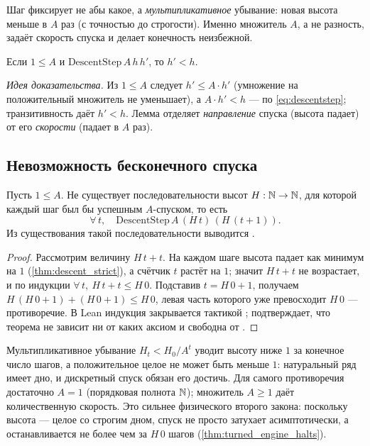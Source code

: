 Шаг фиксирует не абы какое, а \emph{мультипликативное} убывание: новая высота меньше в $A$ раз (с
точностью до строгости). Именно множитель $A$, а не разность, задаёт скорость спуска и делает
конечность неизбежной.

\begin{lemma}\label{thm:descent_strict}
\green{}\; Если $1\le A$ и $\mathrm{DescentStep}\,A\,h\,h'$, то $h'<h$.
\end{lemma}

\emph{Идея доказательства.} Из $1\le A$ следует $h'\le A\cdot h'$ (умножение на положительный
множитель не уменьшает), а $A\cdot h'<h$ --- по \cref{eq:descentstep}; транзитивность даёт $h'<h$.
Лемма отделяет \emph{направление} спуска (высота падает) от его \emph{скорости} (падает в $A$ раз).

\subsection{Невозможность бесконечного спуска}

\begin{theorem}\label{thm:no_infinite_descent}
\green{}\; Пусть $1\le A$. Не существует последовательности высот $H:\mathbb{N}\to\mathbb{N}$, для которой каждый шаг
был бы успешным $A$-спуском, то есть
\begin{equation}\label{eq:perpetualheights}
  \forall\, t,\quad \mathrm{DescentStep}\,A\,(H\,t)\,(H\,(t+1)).
\end{equation}
Из существования такой последовательности выводится .
\end{theorem}

\begin{proof}
Рассмотрим величину $H\,t+t$. На каждом шаге высота падает как минимум на $1$ (\cref{thm:descent_strict}),
а счётчик $t$ растёт на $1$; значит $H\,t+t$ не возрастает, и по индукции $\forall\,t,\ H\,t+t\le H\,0$.
Подставив $t=H\,0+1$, получаем $H\,(H\,0+1)+(H\,0+1)\le H\,0$, левая часть которого уже превосходит
$H\,0$ --- противоречие. В Lean индукция закрывается тактикой ; 
подтверждает, что теорема не зависит ни от каких аксиом и свободна от .
\end{proof}

Мультипликативное убывание $H_t<H_0/A^{t}$ уводит высоту ниже $1$ за конечное число шагов, а
положительное целое не может быть меньше $1$: натуральный ряд имеет дно, и дискретный спуск обязан его
достичь. Для самого противоречия достаточно $A=1$ (порядковая полнота $\mathbb{N}$); множитель $A\ge 1$ даёт
количественную скорость. Это сильнее физического второго закона: поскольку высота --- целое со строгим
дном, спуск не просто затухает асимптотически, а останавливается не более чем за $H\,0$ шагов
(\cref{thm:turned_engine_halts}).

